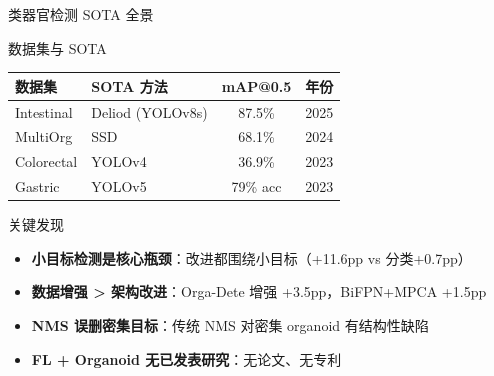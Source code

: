 \documentclass[aspectratio=169, 10pt]{beamer}
\begin{document}
\begin{frame}{类器官检测 SOTA 全景}
  \begin{block}{数据集与 SOTA}
    \begin{tabular}{p{3.2cm}p{3.5cm}cc}
      \toprule
      数据集 & SOTA 方法 & mAP@0.5 & 年份 \\
      \midrule
      Intestinal & Deliod (YOLOv8s) & 87.5\% & 2025 \\
      MultiOrg & SSD & 68.1\% & 2024 \\
      Colorectal & YOLOv4 & 36.9\% & 2023 \\
      Gastric & YOLOv5 & 79\% acc & 2023 \\
      \bottomrule
    \end{tabular}
  \end{block}
  \vspace{0em}
  \begin{block}{关键发现}
    \begin{itemize}
      \item \textbf{小目标检测是核心瓶颈}：改进都围绕小目标（+11.6pp vs 分类+0.7pp）
      \item \textbf{数据增强 > 架构改进}：Orga-Dete 增强 +3.5pp，BiFPN+MPCA +1.5pp
      \item \textbf{NMS 误删密集目标}：传统 NMS 对密集 organoid 有结构性缺陷
      \item \textbf{FL + Organoid 无已发表研究}：无论文、无专利
    \end{itemize}
  \end{block}
\end{frame}
\end{document}
